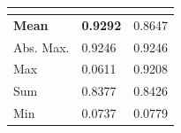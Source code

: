\begin{figure}
        \centering
\begin{minipage}[T]{0.48\textwidth}
    \centering
        \begin{tabular}{l M{0.2\textwidth} M{0.2\textwidth}}
        \toprule
         &  &  \\ \midrule
\textbf{Mean}& \textbf{0.9292}  & 0.8647  \\
Abs. Max.  & 0.9246 & 0.9246 \\
Max &   0.0611  &  0.9208  \\
Sum  & 0.8377  & 0.8426  \\
Min &  0.0737 & 0.0779  \\
        \end{tabular}
    \label{tab:results_cremi_val}
\end{minipage}\hfill
\begin{minipage}[T]{0.48\textwidth}
    \centering
        \begin{tabular}{l M{0.25\textwidth} M{0.25\textwidth}}
        \toprule

\end{tabular}
\end{minipage}
\end{figure}
